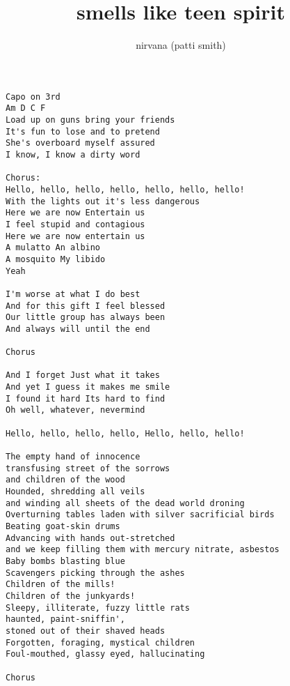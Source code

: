 \author{nirvana (patti smith)}
\title{smells like teen spirit}
\maketitle
\begin{verbatim}
Capo on 3rd
Am D C F
Load up on guns bring your friends
It's fun to lose and to pretend
She's overboard myself assured
I know, I know a dirty word

Chorus:
Hello, hello, hello, hello, hello, hello, hello!
With the lights out it's less dangerous
Here we are now Entertain us
I feel stupid and contagious
Here we are now entertain us
A mulatto An albino
A mosquito My libido
Yeah

I'm worse at what I do best
And for this gift I feel blessed
Our little group has always been
And always will until the end

Chorus

And I forget Just what it takes
And yet I guess it makes me smile
I found it hard Its hard to find
Oh well, whatever, nevermind

Hello, hello, hello, hello, Hello, hello, hello!

The empty hand of innocence
transfusing street of the sorrows
and children of the wood
Hounded, shredding all veils
and winding all sheets of the dead world droning
Overturning tables laden with silver sacrificial birds
Beating goat-skin drums
Advancing with hands out-stretched
and we keep filling them with mercury nitrate, asbestos
Baby bombs blasting blue
Scavengers picking through the ashes
Children of the mills!
Children of the junkyards!
Sleepy, illiterate, fuzzy little rats
haunted, paint-sniffin',
stoned out of their shaved heads
Forgotten, foraging, mystical children
Foul-mouthed, glassy eyed, hallucinating

Chorus
\end{verbatim}